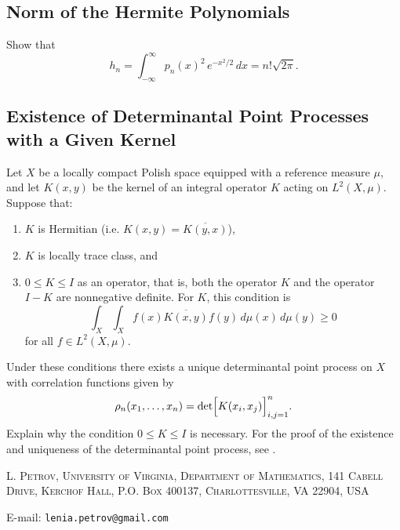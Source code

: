 \documentclass[letterpaper,11pt,oneside,reqno]{article}
\numberwithin{equation}{section}
\theoremstyle{definition}
\begin{document}
\subsection{Norm of the Hermite Polynomials}
\label{prob:norm}

Show that
\begin{equation*}
	h_n=\int_{-\infty}^{\infty} p_n(x)^2\,e^{-x^2/2}\,dx=n!\sqrt{2\pi}.
\end{equation*}




\subsection{Existence of Determinantal Point Processes with a Given Kernel}
Let \(X\) be a locally compact Polish space equipped with a reference measure \(\mu\), and let \(K(x,y)\) be the kernel of an integral operator \(K\) acting on \(L^2(X,\mu)\). Suppose that:
\begin{enumerate}
	\item \(K\) is Hermitian (i.e. \(K(x,y)=\overline{K(y,x)}\)),
	\item \(K\) is locally trace class, and
	\item \(0\le K\le I\) as an operator, that is, both the operator \(K\) and the operator \(I-K\) are nonnegative definite. For $K$, this condition is
	\[
	\int_X\int_X f(x)\overline{K(x,y)}f(y)\,d\mu(x)\,d\mu(y)\ge0
	\]
	for all \(f\in L^2(X,\mu)\).
\end{enumerate}
Under these conditions there exists a unique determinantal point process on \(X\) with correlation functions given by
\[
\rho_n(x_1,\dots,x_n)=\det\Bigl[K(x_i,x_j)\Bigr]_{i,j=1}^n.
\]
Explain why the condition \(0\le K\le I\) is necessary.
For the proof of the existence and uniqueness of the determinantal point process, see \cite{Soshnikov2000}.






\medskip

\textsc{L. Petrov, University of Virginia, Department of Mathematics, 141 Cabell Drive, Kerchof Hall, P.O. Box 400137, Charlottesville, VA 22904, USA}

E-mail: \texttt{lenia.petrov@gmail.com}
\end{document}
